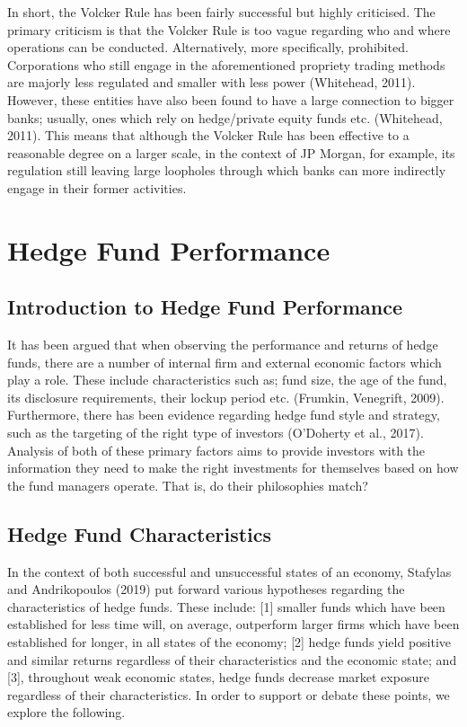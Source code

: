 \documentclass[11pt, english]{article}
\begin{document}
	In short, the Volcker Rule has been fairly successful but highly criticised. The primary criticism is that the Volcker Rule is too vague regarding who and where operations can be conducted. Alternatively, more specifically, prohibited. Corporations who still engage in the aforementioned propriety trading methods are majorly less regulated and smaller with less power (Whitehead, 2011). However, these entities have also been found to have a large connection to bigger banks; usually, ones which rely on hedge/private equity funds etc. (Whitehead, 2011). This means that although the Volcker Rule has been effective to a reasonable degree on a larger scale, in the context of JP Morgan, for example, its regulation still leaving large loopholes through which banks can more indirectly engage in their former activities.

\newpage

\section{Hedge Fund Performance}

	\subsection{Introduction to Hedge Fund Performance}

	It has been argued that when observing the performance and returns of hedge funds, there are a number of internal firm and external economic factors which play a role. These include characteristics such as; fund size, the age of the fund, its disclosure requirements, their lockup period etc. (Frumkin, Venegrift, 2009). Furthermore, there has been evidence regarding hedge fund style and strategy, such as the targeting of the right type of investors (O’Doherty et al., 2017). Analysis of both of these primary factors aims to provide investors with the information they need to make the right investments for themselves based on how the fund managers operate. That is, do their philosophies match?

	\subsection{Hedge Fund Characteristics}

	In the context of both successful and unsuccessful states of an economy, Stafylas and Andrikopoulos (2019) put forward various hypotheses regarding the characteristics of hedge funds. These include: [1] smaller funds which have been established for less time will, on average, outperform larger firms which have been established for longer, in all states of the economy; [2] hedge funds yield positive and similar returns regardless of their characteristics and the economic state; and [3], throughout weak economic states, hedge funds decrease market exposure regardless of their characteristics. In order to support or debate these points, we explore the following.\\
\end{document}
